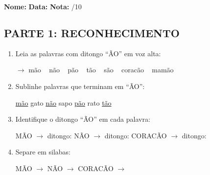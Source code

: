 \begin{exercicio}
\noindent\textbf{Nome:} \underline{\hspace{3.2cm}} \quad \textbf{Data:} \underline{\hspace{1.6cm}} \quad \textbf{Nota:} \underline{\hspace{0.9cm}}/10

\subsection*{PARTE 1: RECONHECIMENTO}

\begin{enumerate}
  \item Leia as palavras com ditongo ``\~AO'' em voz alta:
  \begin{center}
  $\rightarrow$ m\~ao  ~  n\~ao  ~  p\~ao  ~  t\~ao  ~  s\~ao  ~  corac\~ao  ~  mam\~ao
  \end{center}

  \item Sublinhe palavras que terminam em ``\~AO'':
  \begin{center}
  \uline{m\~ao} \quad gato \quad \uline{n\~ao} \quad sapo \quad \uline{p\~ao} \quad rato \quad \uline{t\~ao}
  \end{center}

  \item Identifique o ditongo ``\~AO'' em cada palavra:
  \begin{center}
  M\~AO $\rightarrow$ ditongo: \underline{\hspace{1cm}} \quad N\~AO $\rightarrow$ ditongo: \underline{\hspace{1cm}} \quad CORAC\~AO $\rightarrow$ ditongo: \underline{\hspace{1cm}}
  \end{center}

  \item Separe em silabas:
  \begin{center}
  M\~AO $\rightarrow$ \underline{\hspace{1cm}} \quad N\~AO $\rightarrow$ \underline{\hspace{1cm}} \quad CORAC\~AO $\rightarrow$ \underline{\hspace{1cm}} \underline{\hspace{1cm}} \underline{\hspace{1cm}}
  \end{center}


\end{enumerate}
\end{exercicio}
